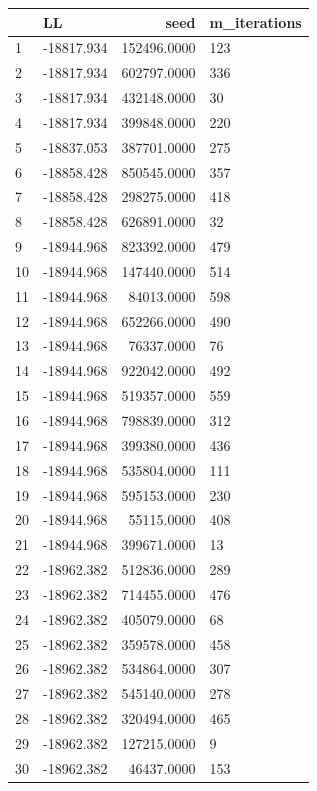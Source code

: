 \documentclass[]{book}
\theoremstyle{definition}
\theoremstyle{definition}
\theoremstyle{definition}
\theoremstyle{remark}
\begin{document}
\begin{tabular}{l|l|r|l}
\hline
  & LL & seed & m\_iterations\\
\hline
1 & -18817.934 & 152496.0000 & 123\\
\hline
2 & -18817.934 & 602797.0000 & 336\\
\hline
3 & -18817.934 & 432148.0000 & 30\\
\hline
4 & -18817.934 & 399848.0000 & 220\\
\hline
5 & -18837.053 & 387701.0000 & 275\\
\hline
6 & -18858.428 & 850545.0000 & 357\\
\hline
7 & -18858.428 & 298275.0000 & 418\\
\hline
8 & -18858.428 & 626891.0000 & 32\\
\hline
9 & -18944.968 & 823392.0000 & 479\\
\hline
10 & -18944.968 & 147440.0000 & 514\\
\hline
11 & -18944.968 & 84013.0000 & 598\\
\hline
12 & -18944.968 & 652266.0000 & 490\\
\hline
13 & -18944.968 & 76337.0000 & 76\\
\hline
14 & -18944.968 & 922042.0000 & 492\\
\hline
15 & -18944.968 & 519357.0000 & 559\\
\hline
16 & -18944.968 & 798839.0000 & 312\\
\hline
17 & -18944.968 & 399380.0000 & 436\\
\hline
18 & -18944.968 & 535804.0000 & 111\\
\hline
19 & -18944.968 & 595153.0000 & 230\\
\hline
20 & -18944.968 & 55115.0000 & 408\\
\hline
21 & -18944.968 & 399671.0000 & 13\\
\hline
22 & -18962.382 & 512836.0000 & 289\\
\hline
23 & -18962.382 & 714455.0000 & 476\\
\hline
24 & -18962.382 & 405079.0000 & 68\\
\hline
25 & -18962.382 & 359578.0000 & 458\\
\hline
26 & -18962.382 & 534864.0000 & 307\\
\hline
27 & -18962.382 & 545140.0000 & 278\\
\hline
28 & -18962.382 & 320494.0000 & 465\\
\hline
29 & -18962.382 & 127215.0000 & 9\\
\hline
30 & -18962.382 & 46437.0000 & 153\\

\end{tabular}
\end{document}
